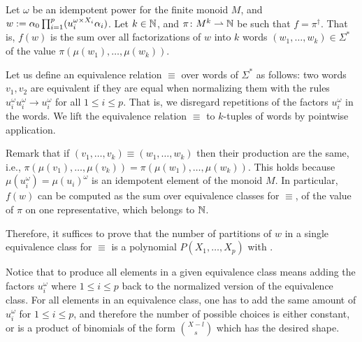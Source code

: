 \begin{proofof}
    Let $\omega$ be an idempotent power for the finite monoid $M$,
    and
    $w \mathrel{:=} \alpha_0 \prod_{i = 1}^p (u_i^{\omega \times X_i} \alpha_i)$.
    Let $k \in \mathbb{N}$, and $\pi \colon M^k \rightharpoonup \mathbb{N}$ be such that
    $f = \pi^\dagger$. That is, 
    $f(w)$ is the sum over all factorizations of $w$
    into $k$ words $(w_1, \dots, w_k) \in \Sigma^*$
    of the value $\pi(\mu(w_1), \dots, \mu(w_k))$.

    Let us define an equivalence relation $\equiv$ over words of
    $\Sigma^*$ as follows: two words $v_1, v_2$ are equivalent if they are
    equal when normalizing them with the rules $u_i^{\omega} u_i^{\omega} \to
    u_i^{\omega}$ for all $1 \leq i \leq p$. That is, we disregard
    repetitions of the factors $u_i^{\omega}$ in the words.
    We lift the equivalence relation $\equiv$ to $k$-tuples of
    words by pointwise application.

    Remark that if $(v_1, \dots, v_k) \equiv (w_1, \dots, w_k)$ then their
    production are the same, i.e., $\pi(\mu(v_1), \dots, \mu(v_k)) =
    \pi(\mu(w_1), \dots, \mu(w_k))$. This holds because $\mu(u_i^\omega) =
    \mu(u_i)^\omega$ is an idempotent element of the monoid $M$. In particular,
    $f(w)$ can be computed as the sum over equivalence classes for $\equiv$, of
    the value of $\pi$ on one representative, which belongs to $\mathbb{N}$.

    Therefore, it suffices to prove that the number of partitions of $w$ in a
    single equivalence class for $\equiv$ is a polynomial $P(X_1, \dots, X_p)$
    with  .

    Notice that to produce all elements in a given equivalence class
    means adding the factors $u_i^\omega$ where $1 \leq i \leq p$
    back to the normalized version
    of the equivalence class. For all elements in an equivalence class,
    one has to add the same amount of $u_i^\omega$ for $1 \leq i \leq p$,
    and therefore the number of possible choices
    is either constant, or 
    is a product of binomials of the form $\binom{X - l}{s}$
    which has the desired shape.
\end{proofof}

